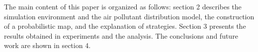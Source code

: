 The main content of this paper is organized as follows: section 2 describes the simulation environment and the air pollutant distribution model, the construction of a probabilistic map, and the explanation of strategies. 
Section 3 presents the results obtained in experiments and the analysis. 
The conclusions and future work are shown in section 4.
